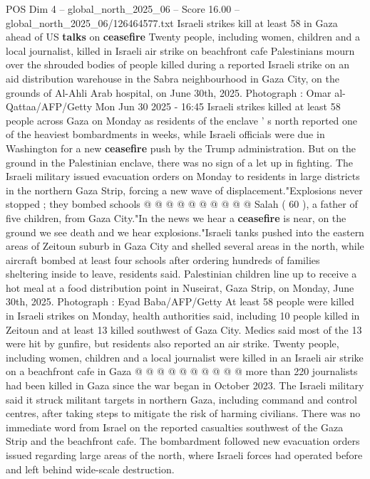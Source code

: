 \begin{textsample}{POS Dim 4 – global\_north\_2025\_06 – Score 16.00 – global\_north\_2025\_06/126464577.txt}  \label{ex:f4_pos_389}
Israeli strikes kill at least 58 in Gaza ahead of US \textbf{talks} on \textbf{ceasefire} Twenty people, including women, children and a local journalist, killed in Israeli air strike on beachfront cafe Palestinians mourn over the shrouded bodies of people killed during a reported Israeli strike on an aid distribution warehouse in the Sabra neighbourhood in Gaza City, on the grounds of Al-Ahli Arab hospital, on June 30th, 2025.
Photograph : Omar al-Qattaa/AFP/Getty Mon Jun 30 2025 - 16:45 Israeli strikes killed at least 58 people across Gaza on Monday as residents of the enclave ' s north reported one of the heaviest bombardments in weeks, while Israeli officials were due in Washington for a new \textbf{ceasefire} push by the Trump administration.
But on the ground in the Palestinian enclave, there was no sign of a let up in fighting.
The Israeli military issued evacuation orders on Monday to residents in large districts in the northern Gaza Strip, forcing a new wave of displacement."Explosions never stopped ; they bombed schools @ @ @ @ @ @ @ @ @ @ Salah ( 60 ), a father of five children, from Gaza City."In the news we hear a \textbf{ceasefire} is near, on the ground we see death and we hear explosions."Israeli tanks pushed into the eastern areas of Zeitoun suburb in Gaza City and shelled several areas in the north, while aircraft bombed at least four schools after ordering hundreds of families sheltering inside to leave, residents said.
Palestinian children line up to receive a hot meal at a food distribution point in Nuseirat, Gaza Strip, on Monday, June 30th, 2025.
Photograph : Eyad Baba/AFP/Getty At least 58 people were killed in Israeli strikes on Monday, health authorities said, including 10 people killed in Zeitoun and at least 13 killed southwest of Gaza City.
Medics said most of the 13 were hit by gunfire, but residents also reported an air strike.
Twenty people, including women, children and a local journalist were killed in an Israeli air strike on a beachfront cafe in Gaza @ @ @ @ @ @ @ @ @ @ more than 220 journalists had been killed in Gaza since the war began in October 2023.
The Israeli military said it struck militant targets in northern Gaza, including command and control centres, after taking steps to mitigate the risk of harming civilians.
There was no immediate word from Israel on the reported casualties southwest of the Gaza Strip and the beachfront cafe.
The bombardment followed new evacuation orders issued regarding large areas of the north, where Israeli forces had operated before and left behind wide-scale destruction.

\end{textsample}
